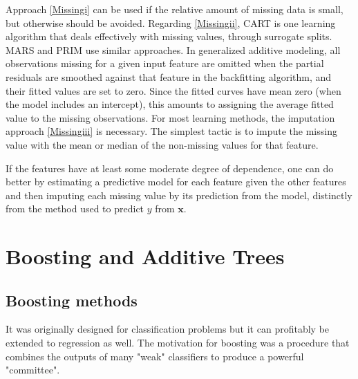 \documentclass[12pt, letterpaper]{article}
\theoremstyle{definition}
\newcommand{\x}{\mathbf{x}}
\begin{document}
Approach \autoref{Missingi} can be used if the relative amount of missing data is small, but otherwise should be avoided. Regarding \autoref{Missingii}, CART is one learning algorithm that deals effectively with missing values, through surrogate splits. MARS and PRIM use similar approaches. In generalized additive modeling, all observations missing for a given input feature are omitted when the partial residuals are smoothed against that feature in the backfitting algorithm, and their fitted values are set to zero. Since the fitted curves have mean zero (when the model includes an intercept), this amounts to assigning the average fitted value to the missing observations.
For most learning methods, the imputation approach \autoref{Missingiii} is necessary. The simplest tactic is to impute the missing value with the mean or median of the non-missing values for that feature.

If the features have at least some moderate degree of dependence, one can do better by estimating a predictive model for each feature given the other features and then imputing each missing value by its prediction from the model, distinctly from the method used to predict $y$ from $\x$.

\section{Boosting and Additive Trees}
\subsection{Boosting methods}
 It was originally designed for classification problems but it can profitably be extended to regression as well. The motivation for boosting was a procedure that combines the outputs of many "weak" classifiers to produce a powerful "committee".
\end{document}
